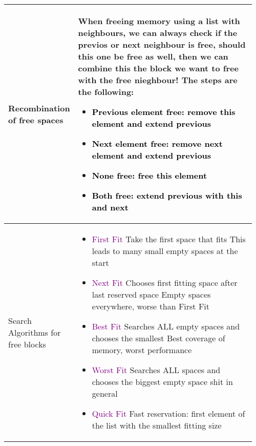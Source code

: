 \documentclass[main.tex,fontsize=8pt,paper=a4,paper=portrait,DIV=calc,]{scrartcl}
\begin{document}
\pagebreak 
\begin{table}[ht!]
\begin{tabular}{|m{0.2\linewidth}|m{0.755\linewidth}|}
\hline
Recombination of free spaces & 
When freeing memory using a list with neighbours, we can always check if the previos or next neighbour is free, should this one be free as well, then we can combine this the block we want to free with the free nieghbour!\newline
The steps are the following:\newline
\begin{itemize}
\item \textcolor{black}{Previous element free: remove this element and extend previous}
\item \textcolor{black}{Next element free: remove next element and extend previous}
\item \textcolor{black}{None free: free this element}
\item \textcolor{black}{Both free: extend previous with this and next}
\vspace{-3mm}
\end{itemize} \\
\hline
Search Algorithms for free blocks &
\vspace{2mm}
\begin{itemize}
\item \textcolor{purple}{First Fit}\newline
  Take the first space that fits\newline
  This leads to many small empty spaces at the start
\item \textcolor{purple}{Next Fit}\newline
  Chooses first fitting space after last reserved space\newline
  Empty spaces everywhere, worse than First Fit
\item \textcolor{purple}{Best Fit}\newline
  Searches ALL empty spaces and chooses the smallest\newline
  Best coverage of memory, worst performance
\item \textcolor{purple}{Worst Fit}\newline
  Searches ALL spaces and chooses the biggest empty space\newline
  shit in general
\item \textcolor{purple}{Quick Fit}\newline
Fast reservation: first element of the list with the smallest fitting size\newline

\end{itemize}
\end{tabular}
\end{table}
\end{document}

